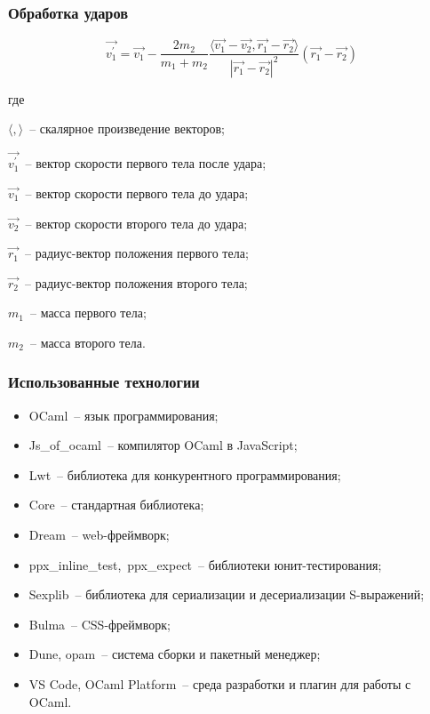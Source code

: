 \documentclass[xetex,aspectratio=43]{beamer}
\newenvironment{Underequation}{
    \small
    \noindent
    где
    \hspace{-1.45ex}
    \setlength{\parindent}{3.5ex}
}{}
\begin{document}
\begin{frame}
    \frametitle{Обработка ударов}

    \begin{equation}\label{collisionhandle}
        \vec{v_1^\prime} = \vec{v_1} - \frac{2 m_2}{m_1 + m_2}
        \frac{\langle \vec{v_1} - \vec{v_2}, \vec{r_1} - \vec{r_2} \rangle }{\left| \vec{r_1} - \vec{r_2} \right|^2}
        (\vec{r_1} - \vec{r_2})
    \end{equation}

    \begin{Underequation}
        \(\langle , \rangle\)~-- скалярное произведение векторов;

        \(\vec{v_1^\prime}\)~-- вектор скорости первого тела после удара;

        \(\vec{v_1}\)~-- вектор скорости первого тела до удара;

        \(\vec{v_2}\)~-- вектор скорости второго тела до удара;

        \(\vec{r_1}\)~-- радиус-вектор положения первого тела;

        \(\vec{r_2}\)~-- радиус-вектор положения второго тела;

        \(m_1\)~-- масса первого тела;

        \(m_2\)~-- масса второго тела.
    \end{Underequation}

\end{frame}

\begin{frame}
    \frametitle{Использованные технологии}

    \begin{itemize}
        \item OCaml~-- язык программирования;
        \item Js\_of\_ocaml~-- компилятор OCaml в JavaScript;
        \item Lwt~-- библиотека для конкурентного программирования;
        \item Core~-- стандартная библиотека;
        \item Dream~-- web-фреймворк;
        \item ppx\_inline\_test,~ppx\_expect~-- библиотеки юнит-тестирования;
        \item Sexplib~-- библиотека для сериализации и десериализации S-выражений;
        \item Bulma~-- CSS-фреймворк;
        \item Dune, opam~-- система сборки и пакетный менеджер;
        \item VS Code, OCaml Platform~-- среда разработки и плагин для работы с OCaml.
    \end{itemize}


\end{frame}
\end{document}
